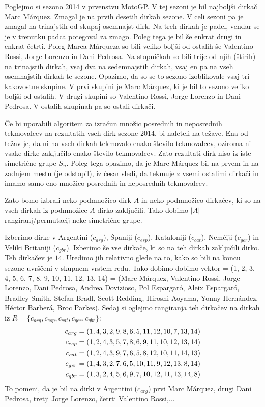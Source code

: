\documentclass[a4paper, 12pt]{book}
\begin{document}
Poglejmo si sezono 2014 v prvenstvu MotoGP. V tej sezoni je bil najboljši dirkač Marc Márquez. Zmagal je na prvih desetih dirkah sezone. V celi sezoni pa je zmagal na trinajstih od skupaj osemnajst dirk. Na treh dirkah je padel, vendar se je v trenutku padca potegoval za zmago. Poleg tega je bil še enkrat drugi in enkrat četrti. Poleg Marca Márqueza so bili veliko boljši od ostalih še Valentino Rossi, Jorge Lorenzo in Dani Pedrosa. Na stopničkah so bili trije od njih (štirih) na trinajstih dirkah, vsaj dva na sedemnajstih dirkah, vsaj en pa na vseh osemnajstih dirkah te sezone. Opazimo, da so se to sezono izoblikovale vsaj tri kakovostne skupine. V prvi skupini je Marc Márquez, ki je bil to sezono veliko boljši od ostalih. V drugi skupini so Valentino Rossi, Jorge Lorenzo in Dani Pedrosa. V ostalih skupinah pa so ostali dirkači.

Če bi uporabili algoritem za izračun množic posrednih in neposrednih tekmovalcev na rezultatih vseh dirk sezone 2014, bi naleteli na težave. Ena od težav je, da ni na vseh dirkah tekmovalo enako število tekmovalcev, oziroma ni vsake dirke zaključilo enako število tekmovalcev. Zato rezultati dirk niso iz iste simetrične grupe $S_n$. Poleg tega opazimo, da je Marc Márquez bil na prvem in na zadnjem mestu (je odstopil), iz česar sledi, da tekmuje z vsemi ostalimi dirkači in imamo samo eno množico posrednih in neposrednih tekmovalcev.

Zato bomo izbrali neko podmnožico dirk $A$ in neko podmnožico dirkačev, ki so na vseh dirkah iz podmnožice $A$ dirko zaključili. Tako dobimo $|A|$ rangiranj/permutacij neke simetrične grupe.

Izberimo dirke v Argentini ($c_{arg}$), Španiji ($c_{esp}$), Kataloniji ($c_{cat}$), Nemčiji ($c_{ger}$) in Veliki Britaniji ($c_{gbr}$). Izberimo še vse dirkače, ki so na teh dirkah zaključili dirko. Teh dirkačev je $14$. Uredimo jih relativno glede na to, kako so bili na koncu sezone uvrščeni v skupnem vrstem redu. Tako dobimo dobimo vektor = (1, 2, 3, 4, 5, 6, 7, 8, 9, 10, 11, 12, 13, 14) = (Marc Márquez, Valentino Rossi, Jorge Lorenzo, Dani Pedrosa, Andrea Dovizioso, Pol Espargaró, Aleix Espargaró, Bradley Smith, Stefan Bradl, Scott Redding, Hiroshi Aoyama, Yonny Hernández, Héctor Barberá, Broc Parkes). Sedaj si oglejmo rangiranja teh dirkačev na dirkah iz $R = \{ c_{arg}, c_{esp}, c_{cat}, c_{ger}, c_{gbr} \}$:
\begin{align}
    c_{arg} &= (1, 4, 3, 2, 9, 8, 6, 5, 11, 12, 10, 7, 13, 14) \notag\\
    c_{esp} &= (1, 2, 4, 3, 5, 7, 8, 6, 9, 11, 10, 12, 13, 14) \notag\\
    c_{cat} &= (1, 2, 4, 3, 9, 7, 6, 5, 8, 12, 10, 11, 14, 13) \notag\\
    c_{ger} &= (1, 4, 3, 2, 7, 6, 5, 10, 11, 9, 12, 13, 8, 14) \notag\\
    c_{gbr} &= (1, 3, 2, 4, 5, 6, 9, 7, 10, 12, 11, 13, 14, 8) \notag
\end{align}
To pomeni, da je bil na dirki v Argentini ($c_{arg}$) prvi Marc Márquez, drugi Dani Pedrosa, tretji Jorge Lorenzo, četrti Valentino Rossi,...
\end{document}
